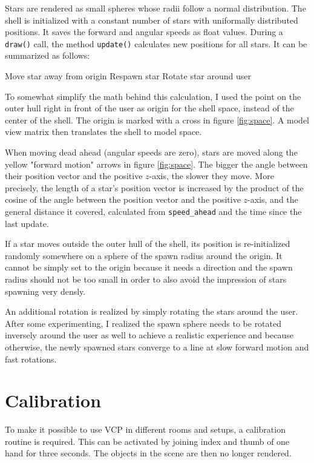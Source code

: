 \documentclass[hyperref, bachelorofscience]{cgvpub}
\begin{document}
Stars are rendered as small spheres whose radii follow a normal distribution. The shell is initialized with a constant number of stars with uniformally distributed positions. It saves the forward and angular speeds as float values. During a \lstinline|draw()| call, the method \lstinline|update()| calculates new positions for all stars. It can be summarized as follows:

\begin{algorithmic}
		\State Move star away from origin
			\State Respawn star
		\Else
			\State Rotate star around user
		\EndIf
	\EndFor
\end{algorithmic}

To somewhat simplify the math behind this calculation, I used the point on the outer hull right in front of the user as origin for the shell space, instead of the center of the shell. The origin is marked with a cross in figure \ref{fig:space}. A model view matrix then translates the shell to model space. 

When moving dead ahead (angular speeds are zero), stars are moved along the yellow "forward motion" arrows in figure \ref{fig:space}. The bigger the angle between their position vector and the positive $ z $-axis, the slower they move. More precisely, the length of a star's position vector is increased by the product of the cosine of the angle between the position vector and the positive $ z $-axis, and the general distance it covered, calculated from \lstinline|speed_ahead| and the time since the last update.

If a star moves outside the outer hull of the shell, its position is re-initialized randomly somewhere on a sphere of the spawn radius around the origin. It cannot be simply set to the origin because it needs a direction and the spawn radius should not be too small in order to also avoid the impression of stars spawning very densly.

An additional rotation is realized by simply rotating the stars around the user. After some experimenting, I realized the spawn sphere needs to be rotated inversely around the user as well to achieve a realistic experience and because otherwise, the newly spawned stars converge to a line at slow forward motion and fast rotations.

\section{Calibration} \label{sec:cal}
To make it possible to use \gls{VCP} in different rooms and setups, a calibration routine is required. This can be activated by joining index and thumb of one hand for three seconds. The objects in the scene are then no longer rendered.
\end{document}

